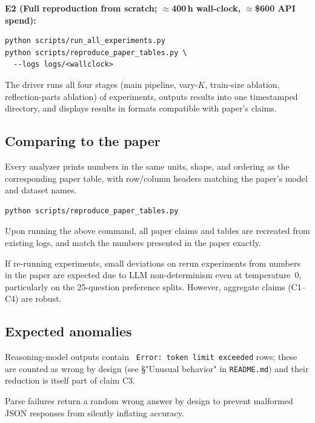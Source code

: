 \noindent\textbf{E2 (Full reproduction from scratch; $\approx$400\,h
wall-clock, $\approx$\$600 API spend):}
\begin{verbatim}
python scripts/run_all_experiments.py
python scripts/reproduce_paper_tables.py \
  --logs logs/<wallclock>
\end{verbatim}
The driver runs all four stages (main pipeline, vary-$K$, train-size
ablation, reflection-parts ablation) of experiments, outputs results into one timestamped directory, and displays results in formats compatible with paper's claims.


\subsection{Comparing to the paper}
Every analyzer prints numbers in the same units, shape, and ordering as
the corresponding paper table, with row/column headers matching the
paper's model and dataset names. 

\begin{verbatim}python scripts/reproduce_paper_tables.py\end{verbatim}
Upon running the above command, all paper claims and tables are recreated from existing logs, and match the numbers presented in the paper exactly.

If re-running experiments, small deviations on rerun experiments from numbers in the paper are expected due to LLM non-determinism
even at temperature~0, particularly on the 25-question preference
splits. However, aggregate claims (C1--C4) are robust.

\subsection{Expected anomalies}
Reasoning-model outputs contain \texttt{ Error: token limit exceeded}
rows; these are counted as wrong by design (see \S "Unusual behavior" in
\texttt{README.md}) and their reduction is itself part of claim C3.

Parse failures return a random wrong answer by design to prevent
malformed JSON responses from silently inflating accuracy.
